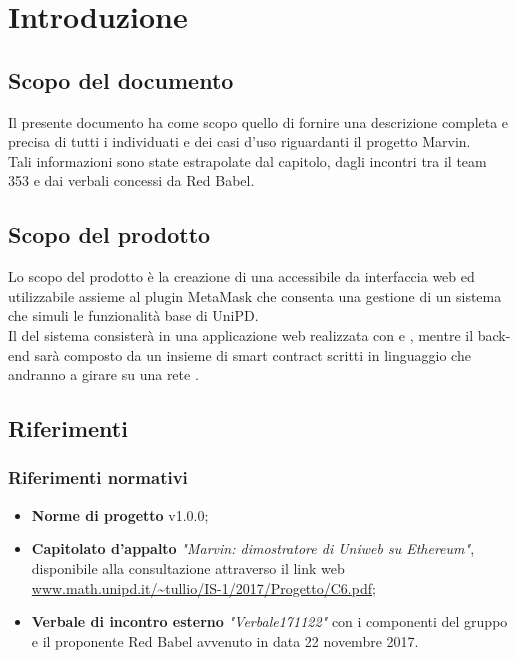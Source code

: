 \documentclass[AnalisiDeiRequisiti.tex]{subfiles}
\begin{document}
\chapter{Introduzione}
\section{Scopo del documento}
Il presente documento ha come scopo quello di fornire una descrizione completa e precisa di tutti i  individuati e dei casi d'uso riguardanti il progetto Marvin.\\
Tali informazioni sono state estrapolate dal capitolo, dagli incontri tra il team 353 e dai verbali concessi da Red Babel.

\section{Scopo del prodotto}
Lo scopo del prodotto è la creazione di una  accessibile da interfaccia web ed utilizzabile assieme al plugin MetaMask che consenta una gestione di un sistema che simuli le funzionalità base di UniPD.\\
Il  del sistema consisterà in una applicazione web realizzata con  e , mentre il back-end sarà composto da un insieme di smart contract scritti in linguaggio  che andranno a girare su una rete .\\

\glossExpl

\section{Riferimenti}

\subsection{Riferimenti normativi}

\begin{itemize}
	\item \textbf{Norme di progetto} v1.0.0;\\
	\item \textbf{Capitolato d'appalto} \textit{"Marvin: dimostratore di Uniweb su Ethereum"}, disponibile alla consultazione attraverso il link web \url{www.math.unipd.it/~tullio/IS-1/2017/Progetto/C6.pdf};\\
	\item \textbf{Verbale di incontro esterno} \textit{"Verbale171122"} con i componenti del gruppo e il proponente Red Babel avvenuto in data 22 novembre 2017.
\end{itemize}
\end{document}
